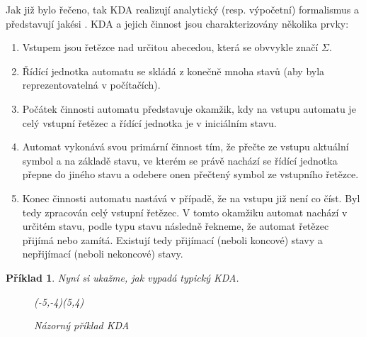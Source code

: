 \documentclass[10pt, a4paper, titlepage]{article}
\theoremstyle{note}
\newtheorem{priklad}{Příklad}
\begin{document}
Jak již bylo řečeno, tak KDA realizují analytický (resp. výpočetní) formalismus a představují jakési .
KDA a jejich činnost jsou charakterizovány několika prvky:
\begin{enumerate}
\item
Vstupem jsou řetězce nad určitou abecedou, která se obvvykle značí $\Sigma$.

\item
Řídící jednotka automatu se skládá z konečně mnoha stavů (aby byla reprezentovatelná v počítačích).

\item
Počátek činnosti automatu představuje okamžik, kdy na vstupu automatu je celý vstupní řetězec a
řídící jednotka je v iniciálním stavu.

\item
Automat vykonává svou primární činnost tím, že přečte ze vstupu aktuální symbol a na základě stavu, ve kterém se právě
nachází se řídící jednotka přepne do jiného stavu a odebere onen přečtený symbol ze vstupního řetězce.

\item
Konec činnosti automatu nastává v případě, že na vstupu již není co číst. Byl tedy zpracován celý
vstupní řetězec. V tomto okamžiku automat nachází v určitém stavu, podle typu stavu následně řekneme, že
automat řetězec přijímá nebo zamítá. Existují tedy přijímací (neboli koncové) stavy a nepřijímací (neboli nekoncové) stavy.
\end{enumerate}

\begin{priklad}
Nyní si ukažme, jak vypadá typický KDA.

\begin{figure}[ht]
\begin{center}
\begin{VCPicture}{(-5,-4)(5,4)}







\end{VCPicture}
\end{center}
\caption{Názorný příklad KDA}\label{obr-kda}
\end{figure}
\end{priklad}
\end{document}
